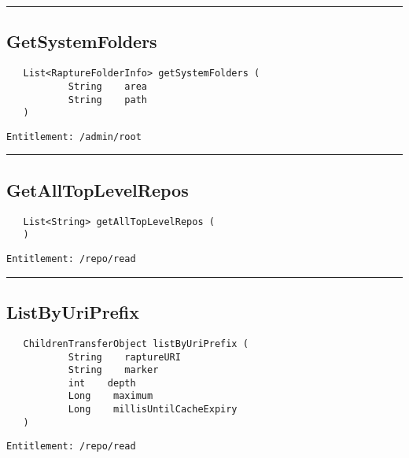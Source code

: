 \rule{12cm}{2pt}
\subsection{GetSystemFolders}
\label{Api:GetSystemFolders}
\begin{verbatim}
   List<RaptureFolderInfo> getSystemFolders (
           String    area
           String    path
   )
\end{verbatim}
\begin{Verbatim}[fontsize=\small, formatcom=\color{Maroon}]
  Entitlement: /admin/root
\end{Verbatim}



\rule{12cm}{2pt}
\subsection{GetAllTopLevelRepos}
\label{Api:GetAllTopLevelRepos}
\begin{verbatim}
   List<String> getAllTopLevelRepos (
   )
\end{verbatim}
\begin{Verbatim}[fontsize=\small, formatcom=\color{Maroon}]
  Entitlement: /repo/read
\end{Verbatim}



\rule{12cm}{2pt}
\subsection{ListByUriPrefix}
\label{Api:ListByUriPrefix}
\begin{verbatim}
   ChildrenTransferObject listByUriPrefix (
           String    raptureURI
           String    marker
           int    depth
           Long    maximum
           Long    millisUntilCacheExpiry
   )
\end{verbatim}
\begin{Verbatim}[fontsize=\small, formatcom=\color{Maroon}]
  Entitlement: /repo/read
\end{Verbatim}




